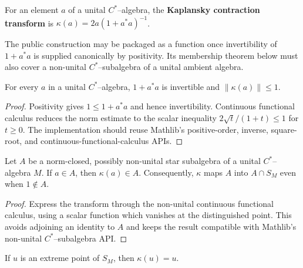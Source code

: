 \begin{definition}
  \label{def:kaplansky_transform}
  \leanok
  For an element $a$ of a unital $C^{*}$--algebra, the \textbf{Kaplansky contraction transform} is
  $\kappa(a)=2a(1+a^{*}a)^{-1}$.
\end{definition}

The public construction may be packaged as a function once invertibility of $1+a^{*}a$ is supplied
canonically by positivity.  Its membership theorem below must also cover a non-unital
$C^{*}$--subalgebra of a unital ambient algebra.

\begin{proposition}
  \label{prop:kaplansky_transform_mem_closedBall}
  \leanok
  For every $a$ in a unital $C^{*}$--algebra, $1+a^{*}a$ is invertible and
  $\lVert\kappa(a)\rVert\leq 1$.
\end{proposition}

\begin{proof}
  \leanok
  Positivity gives $1\leq 1+a^{*}a$ and hence invertibility.  Continuous functional calculus
  reduces the norm estimate to the scalar inequality
  $2\sqrt t/(1+t)\leq1$ for $t\geq0$.  The implementation should reuse Mathlib's positive-order,
  inverse, square-root, and continuous-functional-calculus APIs.
\end{proof}

\begin{lemma}
  \label{lem:kaplansky_transform_mem_subalgebra}
  \leanok
  Let $A$ be a norm-closed, possibly non-unital star subalgebra of a unital $C^{*}$--algebra $M$.
  If $a\in A$, then $\kappa(a)\in A$.  Consequently, $\kappa$ maps $A$ into $A\cap S_M$ even
  when $1\notin A$.
\end{lemma}

\begin{proof}
  \leanok
  Express the transform through the non-unital continuous functional calculus, using a scalar
  function which vanishes at the distinguished point.  This avoids adjoining an identity to $A$
  and keeps the result compatible with Mathlib's non-unital $C^{*}$--subalgebra API.
\end{proof}

\begin{lemma}
  \label{lem:kaplansky_transform_fixed_on_extreme}
  \leanok
  If $u$ is an extreme point of $S_M$, then $\kappa(u)=u$.
\end{lemma}


